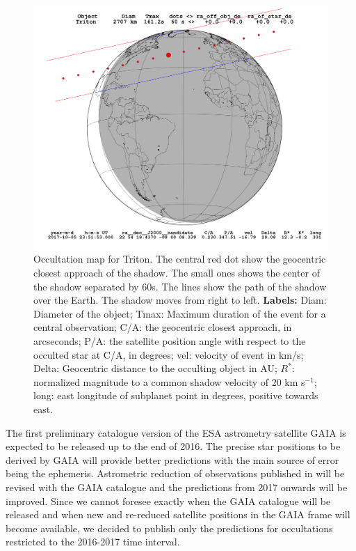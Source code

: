 \begin{figure}
\begin{centering}
\includegraphics[scale=0.4]{figures/Triton_2017-10-05T23:51:53.png}   
\caption{Occultation map for Triton.%
The central red dot show the geocentric closest approach of the shadow. The small ones shows the center of the shadow separated by 60s. The lines show the path of the shadow over the Earth. The shadow moves from right to left.
\textbf{Labels:} Diam: Diameter of the object; Tmax: Maximum duration of the event for a central observation; C/A: the geocentric closest approach, in arcseconds; P/A: the satellite position angle with respect to the occulted star at C/A, in degrees; vel: velocity of event in km/s; Delta: Geocentric distance to the occulting object in AU; $R^*$: normalized magnitude to a common shadow velocity of 20 km s$^{-1}$; long: east longitude of subplanet point in degrees, positive towards east.}
\label{Fig: ocultacao}
\end{centering}
\end{figure}

The first preliminary catalogue version of the ESA astrometry satellite GAIA \citep{deBruijne2012} is expected to be released up to the end of 2016. The precise star positions to be derived by GAIA will provide better predictions with the main source of error being the ephemeris. Astrometric reduction of observations published in \cite{GomesJunior2015} will be revised with the GAIA catalogue and the predictions from 2017 onwards will be improved. Since we cannot foresee exactly when the GAIA catalogue will be released and when new and re-reduced satellite positions in the GAIA frame will become available, we decided to publish only the predictions for occultations restricted to the 2016-2017 time interval.


